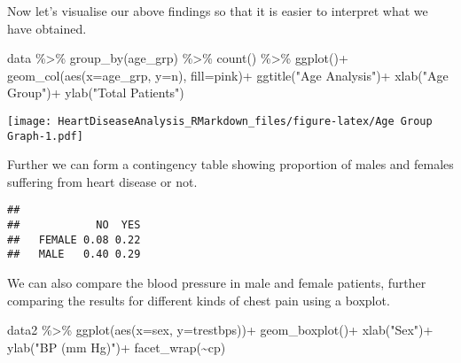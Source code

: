 \documentclass[
]{article}
\newenvironment{Shaded}{\begin{snugshade}}{\end{snugshade}}
\newcommand{\AttributeTok}[1]{\textcolor[rgb]{0.77,0.63,0.00}{#1}}
\newcommand{\DecValTok}[1]{\textcolor[rgb]{0.00,0.00,0.81}{#1}}
\newcommand{\FunctionTok}[1]{\textcolor[rgb]{0.00,0.00,0.00}{#1}}
\newcommand{\NormalTok}[1]{#1}
\newcommand{\SpecialCharTok}[1]{\textcolor[rgb]{0.00,0.00,0.00}{#1}}
\newcommand{\StringTok}[1]{\textcolor[rgb]{0.31,0.60,0.02}{#1}}
\begin{document}
Now let's visualise our above findings so that it is easier to interpret
what we have obtained.

\begin{Shaded}
\begin{Highlighting}[]
\NormalTok{data }\SpecialCharTok{\%\textgreater{}\%} 
  \FunctionTok{group\_by}\NormalTok{(age\_grp) }\SpecialCharTok{\%\textgreater{}\%} 
  \FunctionTok{count}\NormalTok{() }\SpecialCharTok{\%\textgreater{}\%} 
  \FunctionTok{ggplot}\NormalTok{()}\SpecialCharTok{+}
  \FunctionTok{geom\_col}\NormalTok{(}\FunctionTok{aes}\NormalTok{(}\AttributeTok{x=}\NormalTok{age\_grp, }\AttributeTok{y=}\NormalTok{n), }\AttributeTok{fill=}\StringTok{\textquotesingle{}pink\textquotesingle{}}\NormalTok{)}\SpecialCharTok{+}
  \FunctionTok{ggtitle}\NormalTok{(}\StringTok{"Age Analysis"}\NormalTok{)}\SpecialCharTok{+}
  \FunctionTok{xlab}\NormalTok{(}\StringTok{"Age Group"}\NormalTok{)}\SpecialCharTok{+}
  \FunctionTok{ylab}\NormalTok{(}\StringTok{"Total Patients"}\NormalTok{)}
\end{Highlighting}
\end{Shaded}

\texttt{[image: HeartDiseaseAnalysis\_RMarkdown\_files/figure-latex/Age Group Graph-1.pdf]}

Further we can form a contingency table showing proportion of males and
females suffering from heart disease or not.

\begin{Shaded}
\end{Shaded}

\begin{verbatim}
##         
##            NO  YES
##   FEMALE 0.08 0.22
##   MALE   0.40 0.29
\end{verbatim}

We can also compare the blood pressure in male and female patients,
further comparing the results for different kinds of chest pain using a
boxplot.

\begin{Shaded}
\begin{Highlighting}[]
\NormalTok{data2 }\SpecialCharTok{\%\textgreater{}\%} 
  \FunctionTok{ggplot}\NormalTok{(}\FunctionTok{aes}\NormalTok{(}\AttributeTok{x=}\NormalTok{sex, }\AttributeTok{y=}\NormalTok{trestbps))}\SpecialCharTok{+}
  \FunctionTok{geom\_boxplot}\NormalTok{()}\SpecialCharTok{+}
  \FunctionTok{xlab}\NormalTok{(}\StringTok{"Sex"}\NormalTok{)}\SpecialCharTok{+}
  \FunctionTok{ylab}\NormalTok{(}\StringTok{"BP (mm Hg)"}\NormalTok{)}\SpecialCharTok{+}
  \FunctionTok{facet\_wrap}\NormalTok{(}\SpecialCharTok{\textasciitilde{}}\NormalTok{cp)}
\end{Highlighting}
\end{Shaded}
\end{document}

